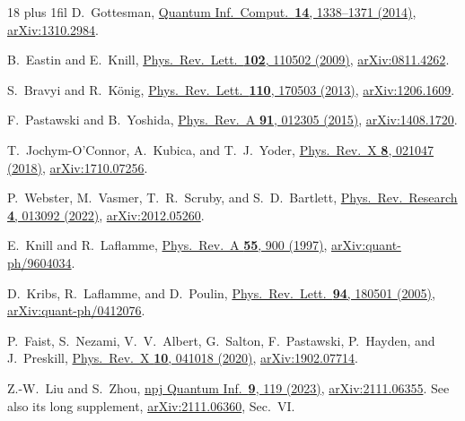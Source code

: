 \documentclass[aps,prl,reprint,notitlepage,nofootinbib,nobibnotes]{revtex4-2}
\begin{document}
\begin{thebibliography}{18}
\rightskip=0pt plus 1fil\relax
{}
D.~Gottesman,
\href{https://doi.org/10.26421/QIC14.15-16-5}
{Quantum Inf.\ Comput.\ \textbf{14}, 1338--1371 (2014)},
\href{https://arxiv.org/abs/1310.2984}{arXiv:1310.2984}.

B.~Eastin and E.~Knill,
\href{https://doi.org/10.1103/PhysRevLett.102.110502}
{Phys.\ Rev.\ Lett.\ \textbf{102}, 110502 (2009)},
\href{https://arxiv.org/abs/0811.4262}{arXiv:0811.4262}.

S.~Bravyi and R.~K\"onig,
\href{https://doi.org/10.1103/PhysRevLett.110.170503}
{Phys.\ Rev.\ Lett.\ \textbf{110}, 170503 (2013)},
\href{https://arxiv.org/abs/1206.1609}{arXiv:1206.1609}.

F.~Pastawski and B.~Yoshida,
\href{https://doi.org/10.1103/PhysRevA.91.012305}
{Phys.\ Rev.\ A \textbf{91}, 012305 (2015)},
\href{https://arxiv.org/abs/1408.1720}{arXiv:1408.1720}.

T.~Jochym-O'Connor, A.~Kubica, and T.~J.~Yoder,
\href{https://doi.org/10.1103/PhysRevX.8.021047}
{Phys.\ Rev.\ X \textbf{8}, 021047 (2018)},
\href{https://arxiv.org/abs/1710.07256}{arXiv:1710.07256}.

P.~Webster, M.~Vasmer, T.~R.~Scruby, and S.~D.~Bartlett,
\href{https://doi.org/10.1103/PhysRevResearch.4.013092}
{Phys.\ Rev.\ Research \textbf{4}, 013092 (2022)},
\href{https://arxiv.org/abs/2012.05260}{arXiv:2012.05260}.

E.~Knill and R.~Laflamme,
\href{https://doi.org/10.1103/PhysRevA.55.900}
{Phys.\ Rev.\ A \textbf{55}, 900 (1997)},
\href{https://arxiv.org/abs/quant-ph/9604034}{arXiv:quant-ph/9604034}.

D.~Kribs, R.~Laflamme, and D.~Poulin,
\href{https://doi.org/10.1103/PhysRevLett.94.180501}
{Phys.\ Rev.\ Lett.\ \textbf{94}, 180501 (2005)},
\href{https://arxiv.org/abs/quant-ph/0412076}{arXiv:quant-ph/0412076}.

P.~Faist, S.~Nezami, V.~V.~Albert, G.~Salton, F.~Pastawski,
P.~Hayden, and J.~Preskill,
\href{https://doi.org/10.1103/PhysRevX.10.041018}
{Phys.\ Rev.\ X \textbf{10}, 041018 (2020)},
\href{https://arxiv.org/abs/1902.07714}{arXiv:1902.07714}.

Z.-W.~Liu and S.~Zhou,
\href{https://doi.org/10.1038/s41534-023-00788-4}
{npj Quantum Inf.\ \textbf{9}, 119 (2023)},
\href{https://arxiv.org/abs/2111.06355}{arXiv:2111.06355}.
See also its long supplement,
\href{https://arxiv.org/abs/2111.06360}{arXiv:2111.06360}, Sec.~VI.


\end{thebibliography}
\end{document}
